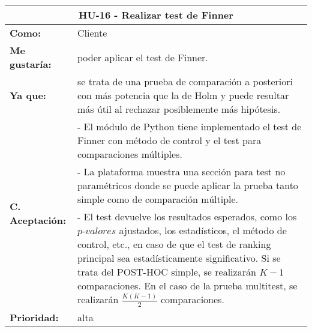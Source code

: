 \begin{table}[H]
	\begin{tabular}{| p{3cm}| p{11cm} |}
		\hline
		\multicolumn{2}{|c|}{\textbf{HU-16} - Realizar test de Finner} \\ \hline
		\textbf{Como:} & Cliente \\ \hline
		\textbf{Me gustaría:} & poder aplicar el test de Finner. \\ \hline
		\textbf{Ya que:} & se trata de una prueba de comparación a posteriori con más potencia que la de Holm y puede resultar más útil al rechazar posiblemente más hipótesis. \\ \hline
		\multirow{3}{11cm}{\textbf{C. Aceptación:}} & - El módulo de Python tiene implementado el test de Finner con método de control y el test para comparaciones múltiples. \\
		& - La plataforma muestra una sección para test no paramétricos donde se puede aplicar la prueba tanto simple como de comparación múltiple. \\
		& - El test devuelve los resultados esperados, como los $\textit{p-valores}$ ajustados, los estadísticos, el método de control, etc., en caso de que el test de ranking principal sea estadísticamente significativo. Si se trata del POST-HOC simple, se realizarán $K-1$ comparaciones. En el caso de la prueba multitest, se realizarán $\frac{K(K-1)}{2}$ comparaciones. \\ \hline
		\textbf{\textbf{Prioridad:}} & alta \\ \hline
	\end{tabular}
\end{table}


